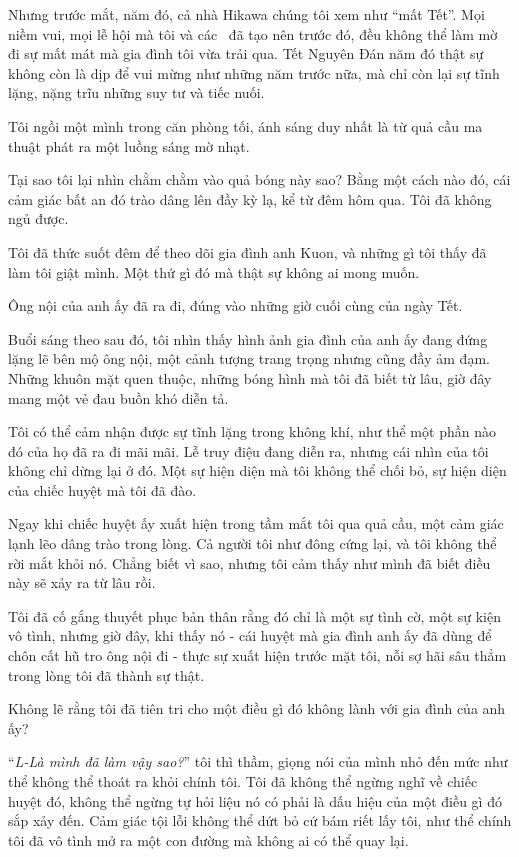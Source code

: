 \documentclass[../main.tex]{subfiles}
\begin{document}
Nhưng trước mắt, năm đó, cả nhà Hikawa chúng tôi xem như ``mất Tết''. Mọi niềm vui, mọi lễ hội mà tôi và các \hll\ đã tạo nên trước đó, đều không thể làm mờ đi sự mất mát mà gia đình tôi vừa trải qua. Tết Nguyên Đán năm đó thật sự không còn là dịp để vui mừng như những năm trước nữa, mà chỉ còn lại sự tĩnh lặng, nặng trĩu những suy tư và tiếc nuối.


Tôi ngồi một mình trong căn phòng tối, ánh sáng duy nhất là từ quả cầu ma thuật phát ra một luồng sáng mờ nhạt.

Tại sao tôi lại nhìn chằm chằm vào quả bóng này sao? Bằng một cách nào đó, cái cảm giác bất an đó trào dâng lên đầy kỳ lạ, kể từ đêm hôm qua. Tôi đã không ngủ được.

Tôi đã thức suốt đêm để theo dõi gia đình anh Kuon, và những gì tôi thấy đã làm tôi giật mình. Một thứ gì đó mà thật sự không ai mong muốn.

Ông nội của anh ấy đã ra đi, đúng vào những giờ cuối cùng của ngày Tết.

Buổi sáng theo sau đó, tôi nhìn thấy hình ảnh gia đình của anh ấy đang đứng lặng lẽ bên mộ ông nội, một cảnh tượng trang trọng nhưng cũng đầy ảm đạm. Những khuôn mặt quen thuộc, những bóng hình mà tôi đã biết từ lâu, giờ đây mang một vẻ đau buồn khó diễn tả.

Tôi có thể cảm nhận được sự tĩnh lặng trong không khí, như thể một phần nào đó của họ đã ra đi mãi mãi. Lễ truy điệu đang diễn ra, nhưng cái nhìn của tôi không chỉ dừng lại ở đó. Một sự hiện diện mà tôi không thể chối bỏ, sự hiện diện của chiếc huyệt mà tôi đã đào.

Ngay khi chiếc huyệt ấy xuất hiện trong tầm mắt tôi qua quả cầu, một cảm giác lạnh lẽo dâng trào trong lòng. Cả người tôi như đông cứng lại, và tôi không thể rời mắt khỏi nó. Chẳng biết vì sao, nhưng tôi cảm thấy như mình đã biết điều này sẽ xảy ra từ lâu rồi.

Tôi đã cố gắng thuyết phục bản thân rằng đó chỉ là một sự tình cờ, một sự kiện vô tình, nhưng giờ đây, khi thấy nó - cái huyệt mà gia đình anh ấy đã dùng để chôn cất hũ tro ông nội đi - thực sự xuất hiện trước mặt tôi, nỗi sợ hãi sâu thẳm trong lòng tôi đã thành sự thật.

Không lẽ rằng tôi đã tiên tri cho một điều gì đó không lành với gia đình của anh ấy?

``\textit{L-Là mình đã làm vậy sao?}'' tôi thì thầm, giọng nói của mình nhỏ đến mức như thể không thể thoát ra khỏi chính tôi. Tôi đã không thể ngừng nghĩ về chiếc huyệt đó, không thể ngừng tự hỏi liệu nó có phải là dấu hiệu của một điều gì đó sắp xảy đến. Cảm giác tội lỗi không thể dứt bỏ cứ bám riết lấy tôi, như thể chính tôi đã vô tình mở ra một con đường mà không ai có thể quay lại.
\end{document}

